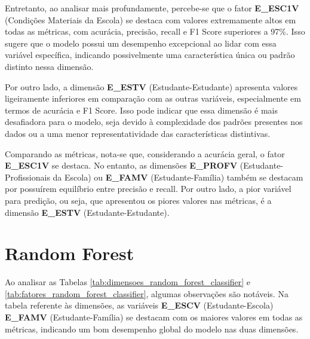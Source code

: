 Entretanto, ao analisar mais profundamente, percebe-se que o fator \textbf{E\_ESC1V} (Condições Materiais da Escola) se destaca com valores extremamente altos em todas as métricas, com acurácia, precisão, recall e F1 Score superiores a 97\%. Isso sugere que o modelo possui um desempenho excepcional ao lidar com essa variável específica, indicando possivelmente uma característica única ou padrão distinto nessa dimensão.

Por outro lado, a dimensão \textbf{E\_ESTV} (Estudante-Estudante) apresenta valores ligeiramente inferiores em comparação com as outras variáveis, especialmente em termos de acurácia e F1 Score. Isso pode indicar que essa dimensão é mais desafiadora para o modelo, seja devido à complexidade dos padrões presentes nos dados ou a uma menor representatividade das características distintivas.

Comparando as métricas, nota-se que, considerando a acurácia geral, o fator \textbf{E\_ESC1V} se destaca. No entanto, as dimensões \textbf{E\_PROFV} (Estudante-Profissionais da
Escola)  ou \textbf{E\_FAMV} (Estudante-Família) também se destacam por possuírem equilíbrio entre precisão e recall. Por outro lado, a pior variável para predição, ou seja, que apresentou os piores valores nas métricas, é a dimensão \textbf{E\_ESTV} (Estudante-Estudante).



\section{Random Forest}

Ao analisar as Tabelas \ref{tab:dimensoes_random_forest_classifier} e \ref{tab:fatores_random_forest_classifier}, algumas observações são notáveis. Na tabela referente às dimensões, as variáveis \textbf{E\_ESCV} (Estudante-Escola) \textbf{E\_FAMV} (Estudante-Família) se destacam com os maiores valores em todas as métricas, indicando um bom desempenho global do modelo nas duas dimensões.

\begin{table}[ht]
    \centering
    \caption{Dimensões sendo testadas no modelo Random Forest}
    \label{tab:dimensoes_random_forest_classifier}
\end{table}

